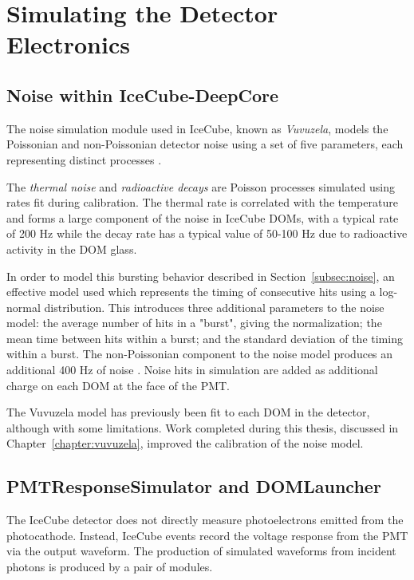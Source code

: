 \section{Simulating the Detector Electronics}

\subsection{Noise within IceCube-DeepCore}
The noise simulation module used in IceCube, known as \emph{Vuvuzela}, models the Poissonian and non-Poissonian detector noise using a set of five  parameters, each representing distinct processes \cite{Thesis-Vuvuzela, Description-IceCube}. 

The \emph{thermal noise} and \emph{radioactive decays} are Poisson processes simulated using rates fit during calibration.
The thermal rate is correlated with the temperature and forms a large component of the noise in IceCube DOMs, with a typical rate of 200 Hz while the decay rate has a typical value of 50-100 Hz due to radioactive activity in the DOM glass.

In order to model this bursting behavior described in Section~\ref{subsec:noise}, an effective model used which represents the timing of consecutive hits using a log-normal distribution. 
This introduces three additional parameters to the noise model: the average number of hits in a "burst", giving the normalization; the mean time between hits within a burst; and the standard deviation of the timing within a burst. 
The non-Poissonian component to the noise model produces an additional 400 Hz of noise \cite{Thesis-Vuvuzela}.
Noise hits in simulation are added as additional charge on each DOM at the face of the PMT.

The Vuvuzela model has previously been fit to each DOM in the detector, although with some limitations. 
Work completed during this thesis, discussed in Chapter~\ref{chapter:vuvuzela}, improved the calibration of the noise model.

\label{subsec:pmtsim}
\subsection{PMTResponseSimulator and DOMLauncher}
The IceCube detector does not directly measure photoelectrons emitted from the photocathode. 
Instead, IceCube events record the voltage response from the PMT via the output waveform.
The production of simulated waveforms from incident photons is produced by a pair of modules.

